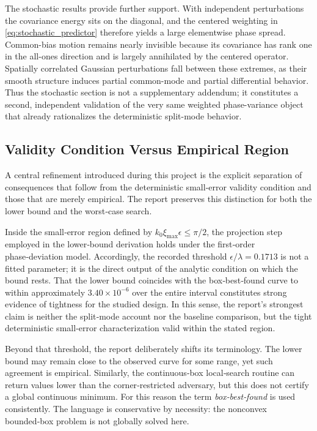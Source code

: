 The stochastic results provide further support. With independent perturbations the covariance energy sits on the diagonal, and the centered weighting in \eqref{eq:stochastic_predictor} therefore yields a large elementwise phase spread. Common-bias motion remains nearly invisible because its covariance has rank one in the all-ones direction and is largely annihilated by the centered operator. Spatially correlated Gaussian perturbations fall between these extremes, as their smooth structure induces partial common-mode and partial differential behavior. Thus the stochastic section is not a supplementary addendum; it constitutes a second, independent validation of the very same weighted phase-variance object that already rationalizes the deterministic split-mode behavior.

\subsection{Validity Condition Versus Empirical Region}

A central refinement introduced during this project is the explicit separation of consequences that follow from the deterministic small‑error validity condition and those that are merely empirical. The report preserves this distinction for both the lower bound and the worst‑case search.

Inside the small‑error region defined by \(k_0 \xi_{\max}\epsilon \le \pi/2\), the projection step employed in the lower‑bound derivation holds under the first‑order phase‑deviation model. Accordingly, the recorded threshold \(\epsilon/\lambda = 0.1713\) is not a fitted parameter; it is the direct output of the analytic condition on which the bound rests. That the lower bound coincides with the box‑best‑found curve to within approximately \(3.40 \times 10^{-6}\) over the entire interval constitutes strong evidence of tightness for the studied design. In this sense, the report’s strongest claim is neither the split‑mode account nor the baseline comparison, but the tight deterministic small‑error characterization valid within the stated region.

Beyond that threshold, the report deliberately shifts its terminology. The lower bound may remain close to the observed curve for some range, yet such agreement is empirical. Similarly, the continuous‑box local‑search routine can return values lower than the corner‑restricted adversary, but this does not certify a global continuous minimum. For this reason the term \emph{box‑best‑found} is used consistently. The language is conservative by necessity: the nonconvex bounded‑box problem is not globally solved here.

